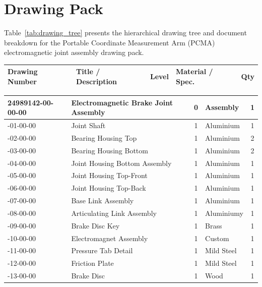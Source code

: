 \chapter{Drawing Pack}
\label{app:drawing_pack}

Table~\ref{tab:drawing_tree} presents the hierarchical drawing tree and document breakdown for the Portable Coordinate Measurement Arm (PCMA) electromagnetic joint assembly drawing pack.

\begin{table}[h!]
	\centering
	\small
	\caption{Hierarchical Drawing Tree and Document Index for the PCMA Joint Assembly}
	\label{tab:drawing_tree}
	\vspace{0.2cm}
	\begin{xltabular}{\linewidth}{l p{5.2cm} c p{3.2cm} c}
		\toprule
		\textbf{Drawing Number} & \textbf{Title / Description} & \textbf{Level} & \textbf{Material / Spec.} & \textbf{Qty} \\
		\midrule
	\end{xltabular}
	\vspace{-0.6cm}
	\begin{xltabular}{\linewidth}{l p{5.2cm} c p{3.2cm} c}
		\textbf{24989142-00-00-00} & \textbf{Electromagnetic Brake Joint Assembly} & \textbf{0} & \textbf{Assembly} & \textbf{1} \\
		\midrule
		-01-00-00 & Joint Shaft & 1 & Aluminium & 1 \\
		-02-00-00 & Bearing Housing Top & 1 & Aluminium & 2 \\
		-03-00-00 & Bearing Housing Bottom & 1 & Aluminium & 2 \\
		-04-00-00 & Joint Housing Bottom Assembly & 1 & Aluminium & 1 \\
		-05-00-00 & Joint Housing Top-Front & 1 & Aluminium & 1 \\
		-06-00-00 & Joint Housing Top-Back & 1 & Aluminium & 1 \\
		-07-00-00 & Base Link Assembly & 1 & Aluminium & 1 \\
		-08-00-00 & Articulating Link Assembly & 1 & Aluminiumy & 1 \\
		-09-00-00 & Brake Disc Key & 1 & Brass & 1 \\
		-10-00-00 & Electromagnet Assembly & 1 & Custom & 1 \\
		-11-00-00 & Pressure Tab Detail & 1 & Mild Steel & 1 \\
		-12-00-00 & Friction Plate & 1 & Mild Steel & 1 \\
		-13-00-00 & Brake Disc & 1 & Wood & 1 \\
		\bottomrule
	\end{xltabular}
\end{table}


